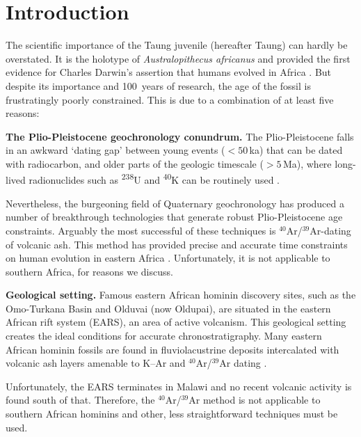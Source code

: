 \documentclass[11pt]{article}
\begin{document}
\section{Introduction}\label{sec:intro}

The scientific importance of the Taung juvenile (hereafter Taung) can
hardly be overstated. It is the holotype of \emph{Australopithecus
africanus} and provided the first evidence for Charles Darwin's
assertion that humans evolved in Africa \citep{dart1925}. But despite
its importance and 100~years of research, the age of the fossil is
frustratingly poorly constrained. This is due to a combination of at
least five reasons:

\textbf{The Plio-Pleistocene geochronology conundrum.} The
Plio-Pleistocene falls in an awkward `dating gap' between young events
($<50\,$ka) that can be dated with radiocarbon, and older parts of the
geologic timescale ($>5\,$Ma), where long-lived radionuclides such as
\textsuperscript{238}U and \textsuperscript{40}K can be routinely
used  \citep{isaac1975}.

Nevertheless, the burgeoning field of Quaternary geochronology has
produced a number of breakthrough technologies that generate robust
Plio-Pleistocene age constraints. Arguably the most successful of
these techniques is ${}^{40}$Ar/${}^{39}$Ar-dating of volcanic
ash. This method has provided precise and accurate time constraints on
human evolution in eastern Africa \citep{deino2023}. Unfortunately, it
is not applicable to southern Africa, for reasons we discuss.

\textbf{Geological setting.} Famous eastern African hominin discovery
sites, such as the Omo-Turkana Basin and Olduvai (now Oldupai), are
situated in the eastern African rift system (EARS), an area of active
volcanism. This geological setting creates the ideal conditions for
accurate chronostratigraphy. Many eastern African hominin fossils are
found in fluviolacustrine deposits intercalated with volcanic ash
layers amenable to K--Ar and ${}^{40}$Ar/${}^{39}$Ar dating
\citep{leakey1961,deino2023}.

Unfortunately, the EARS terminates in Malawi and no recent volcanic
activity is found south of that. Therefore, the
${}^{40}$Ar/${}^{39}$Ar method is not applicable to southern African
hominins and other, less straightforward techniques must be used.
\end{document}
